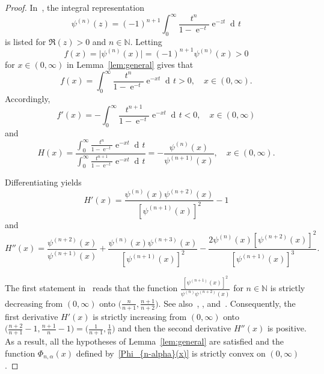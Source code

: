 \documentclass[reqno]{amsart}%
\theoremstyle{plain}
\theoremstyle{remark}
\DeclareMathOperator{\td}{d\!}
\DeclareMathOperator{\te}{e}
\begin{document}
\begin{proof}
In~\cite[p.~260, Entry~6.4.1]{abram}, the integral representation
\begin{equation}\label{psin}
\psi^{(n)}(z)=(-1)^{n+1}\int_{0}^{\infty}\frac{t^n}{1-\te^{-t}}\te^{-zt}\td t
\end{equation}
is listed for $\Re(z)>0$ and $n\in\mathbb{N}$.
Letting 
$$
f(x)=\bigl|\psi^{(n)}(x)\bigr|=(-1)^{n+1}\psi^{(n)}(x)>0
$$ 
for $x\in(0,\infty)$ in Lemma~\ref{lem:general} gives that
\begin{equation*}
f(x)=\int_{0}^{\infty}\frac{t^n}{1-\te^{-t}}\te^{-xt}\td t>0, \quad x\in(0,\infty).
\end{equation*}
Accordingly,
\begin{equation*}
f'(x)=-\int_{0}^{\infty}\frac{t^{n+1}}{1-\te^{-t}}\te^{-xt}\td t<0, \quad x\in(0,\infty)
\end{equation*}
and
\begin{equation*}
H(x)=\frac{\int_{0}^{\infty}\frac{t^n}{1-\te^{-t}}\te^{-xt}\td t} {\int_{0}^{\infty}\frac{t^{n+1}}{1-\te^{-t}}\te^{-xt}\td t}
=-\frac{\psi^{(n)}(x)}{\psi^{(n+1)}(x)}, \quad x\in(0,\infty).
\end{equation*}
\par
Differentiating yields
\begin{equation*}
H'(x)=\frac{\psi^{(n)}(x)\psi^{(n+2)}(x)}{[\psi^{(n+1)}(x)]^2}-1
\end{equation*}
and
\begin{equation*}
H''(x)=\frac{\psi^{(n+2)}(x)}{\psi^{(n+1)}(x)}+\frac{\psi^{(n)}(x) \psi^{(n+3)}(x)}{[\psi^{(n+1)}(x)]^2} -\frac{2\psi^{(n)}(x)[\psi^{(n+2)}(x)]^2}{[\psi^{(n+1)}(x)]^3}.
\end{equation*}
\par
The first statement in~\cite[Theorem~2]{Yang-JMAA-2017} reads that the function $\frac{[\psi^{(n+1)}(x)]^2}{\psi^{(n)}\psi^{(n+2)}(x)}$ for $n\in\mathbb{N}$ is strictly decreasing from $(0,\infty)$ onto $\bigl(\frac{n}{n+1},\frac{n+1}{n+2}\bigr)$.
See also~\cite[Corollary~2.3]{Alzer-Wells-SIAM-98}, \cite[Section~3.5, pp.~10--12]{Qi-Agar-Surv-JIA.tex}, and~\cite[p.~3, Eq.~(8)]{Qi-Nantomah-Lim.tex}. Consequently, the first derivative $H'(x)$ is strictly increasing from $(0,\infty)$ onto $\bigl(\frac{n+2}{n+1}-1, \frac{n+1}{n}-1\bigr)=\bigl(\frac{1}{n+1},\frac{1}{n}\bigr)$ and then the second derivative $H''(x)$ is positive. As a result, all the hypotheses of Lemma~\ref{lem:general} are satisfied and the function $\Phi_{n,\alpha}(x)$ defined by~\eqref{Phi_{n-alpha}(x)} is strictly convex on $(0,\infty)$.

\end{proof}
\end{document}
